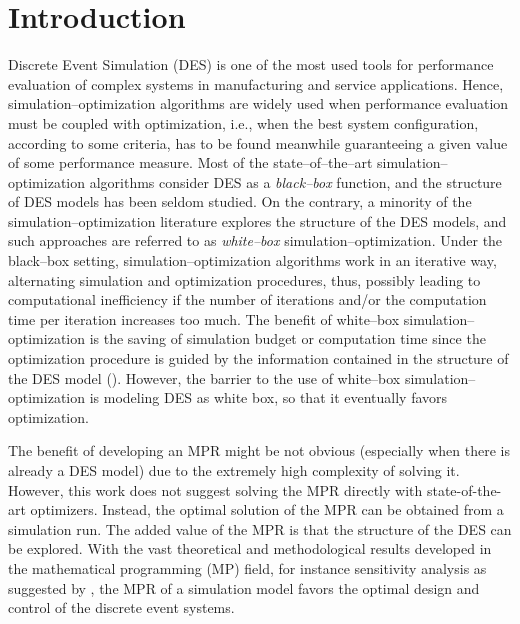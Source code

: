 \documentclass[suppldata]{interact}
\theoremstyle{plain}
\theoremstyle{definition}
\theoremstyle{remark}
\begin{document}
\section{Introduction}
Discrete Event Simulation (DES) is one of the most used tools for performance evaluation of %
complex systems in manufacturing and service applications. Hence, simulation--optimization algorithms are widely used %
when performance evaluation must be coupled with optimization, i.e., when the best system configuration, according to some criteria, has to be found meanwhile guaranteeing a given value of some performance measure.  
Most of the state--of--the--art simulation--optimization algorithms consider DES as a \textit{black--box} function, and the structure of DES models has been seldom studied. On the contrary, a minority of the simulation--optimization literature explores the structure of the DES models, and %
such approaches are referred to as \textit{white--box} simulation--optimization. 
Under the black--box setting, simulation--optimization algorithms work in an iterative way, alternating simulation and optimization procedures, 
thus, possibly leading to computational inefficiency if the number of iterations and/or the computation time per iteration increases too much. 
The benefit of white--box simulation--optimization is the saving of simulation budget or computation time since 
the optimization procedure is guided by the information contained in the structure of the DES model (\cite{zhang2020sample}). However, the barrier to the use of white--box simulation--optimization is modeling DES as white box, so that it eventually favors optimization. 

The benefit of developing an MPR might be not obvious (especially when there is already a DES model) due to the extremely high complexity of solving it. 
However, this work does not suggest solving the MPR directly with state-of-the-art optimizers. Instead, the optimal solution of the MPR can be obtained from a simulation run. The added value of the MPR is that the structure of the DES can be explored. With the vast theoretical and methodological results developed in the mathematical programming (MP) field, for instance sensitivity analysis as suggested by \cite{chan2008optimization}, the MPR of a simulation model favors the optimal design and control of the discrete event systems. 
\end{document}
